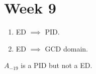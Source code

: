 
\section{Week 9}

\begin{exercise} \mbox{}
  \begin{enumerate}
    \item ED $\implies$ PID.
    \item ED $\implies$ GCD domain.
  \end{enumerate}
\end{exercise}

\begin{exercise}
  $A_{-19}$ is a PID but not a ED.
\end{exercise}
